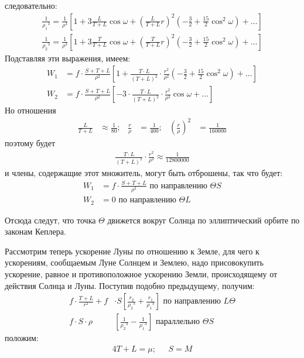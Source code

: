 \documentclass[a4paper,12pt]{article} %
\begin{document}
следовательно:
\begin {align*}
	\frac{1}{\rho_1{}^3} = \frac{1}{\rho^3}\left[1+3\frac{L}{T+L}\cos \omega +\left(\frac{L}{T+L}r\right)^2\left(-\frac32+\frac{15}{2}\cos^2 \omega \right)+\ldots\right]\\
	\frac{1}{\rho_2{}^3} = \frac{1}{\rho^3}\left[1+3\frac{T}{T+L}\cos \omega +\left(\frac{T}{T+L}r\right)^2\left(-\frac32+\frac{15}2\cos^2 \omega \right)+\ldots\right]
\end {align*}
Подставляя эти выражения, имеем:
\begin {align*}
	W_1 &= f\cdot\frac{S+T+L}{\rho^2}\left[1+\frac{T \cdot L}{\left(T+L\right)^2}\cdot\frac{r^2}{\rho^2}\left(-\frac32+\frac{15}2\cos^2 \omega \right)+\ldots\right]\\	
	W_2 &= f\cdot \frac {S+T+L}{\rho^2} \left[-3 \cdot \frac{T\cdot L}{\left(T+L\right)^2}\cdot \frac {r^2}{\rho^2}\cos \omega+\ldots\right]
\end {align*}
Но отношения
\begin {equation*}
	\begin {aligned}
		\frac L{T+L}&\approx\frac1{80}; & \frac r{\rho} &=\frac 1{400}; & \left(\frac r{\rho}\right)^2 &= \frac 1{160000}
	\end {aligned}
\end {equation*}
поэтому будет
\begin {align*}
	\frac{T\cdot L}{\left(T + L\right)^2} \cdot \frac{r^2}{\rho^2}\approx \frac 1{12800000}
\end {align*}
и члены, содержащие этот множитель, могут быть отброшены, так что будет:
\begin {align*}
	W_1 &= f\cdot \frac{S+T+L}{\rho^2} \mbox{ по направлению }\Theta S\\
	W_2 &= 0 \mbox{ по направлению }\Theta L
\end {align*}

Отсюда следут, что точка $\Theta$ движется вокруг Солнца по эллиптический орбите по законам Кеплера.

Рассмотрим теперь ускорение Луны по отношению к Земле, для чего к ускорениям, сообщаемым Луне Солнцем и Землею, надо присовокупить ускорение, равное и противоположное ускорению Земли, происходящему от действия Солнца и Луны. Поступив подобно предыдущему, получим:
	\begin {align*}
		f\cdot\frac{T+L}{r^2}+ f&\cdot S \left[\frac{r_2}{\rho_2{}^3}+\frac{r_1}{\rho_1{}^3}\right]\mbox{ по направлению }L\Theta\\
		f\cdot S \cdot \rho &\left[\frac1{\rho_2{}^3} - \frac1{\rho_1{}^3}\right] \mbox{ параллельно }\Theta S
	\end {align*}
положим:
\begin{alignat*}{4}
	T+L = \mu; & \mbox{  } S = M
\end{alignat*}

\listoftables
\listoffigures
\end{document}
